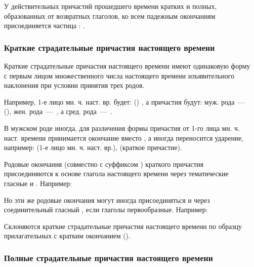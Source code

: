 \documentclass[11pt,a4paper,oneside]{memoir}
\begin{document}
    У действительных причастий прошедшего времени кратких и полных, образованных от возвратных глаголов, ко всем падежным окончаниям присоединяется частица {}: {}.

                \subsubsection{Краткие страдательные причастия настоящего времени}

    Краткие страдательные причастия настоящего времени имеют одинаковую форму с первым лицом множественного числа настоящего времени изъявительного наклонения при условии принятия трех родов.
    
    Например, 1-е лицо мн. ч. наст. вр. будет: ({}) {}, а причастия будут: муж. рода~---~{} ({}), жен. рода~---~{}, а сред. рода~---~{}.
    
    В мужском роде иногда, для различения формы причастия от 1-го лица мн. ч. наст. времени принимается окончание {} вместо {}, а иногда переносится ударение, например: {} (1-е лицо мн. ч. наст. вр.), {} (краткое причастие).
    
    Родовые окончания (совместно с суффиксом {}) краткого причастия {} присоединяются к основе глагола настоящего времени через тематические гласные {} и {}. Например:
    
    \bigskip{}

    Но эти же родовые окончания могут иногда присоединяться и через соединительный гласный {}, если глаголы первообразные. Например:
    
    \bigskip{}

    Склоняются краткие страдательные причастия настоящего времени по образцу прилагательных с кратким окончанием ({}).

                \subsubsection{Полные страдательные причастия настоящего времени}
\end{document}
